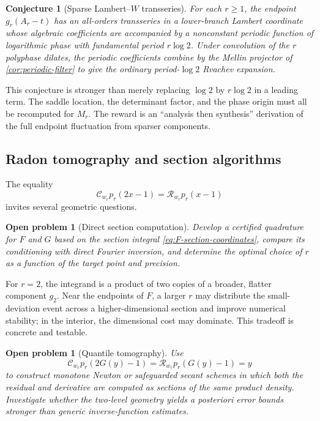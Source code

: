 \documentclass[11pt,oneside]{article}
\numberwithin{equation}{section}
\newtheorem{conjecture}[theorem]{Conjecture}
\newtheorem{problem}[theorem]{Open problem}
\theoremstyle{definition}
\theoremstyle{remark}
\newcommand{\cC}{\mathcal C}
\newcommand{\cR}{\mathcal R}
\begin{document}
\begin{conjecture}[Sparse Lambert--$W$ transseries]
\label{conj:sparse-Lambert}
For each $r\ge1$, the endpoint $g_r(A_r-t)$ has an all-orders transseries in a
lower-branch Lambert coordinate whose algebraic coefficients are accompanied
by a nonconstant periodic function of logarithmic phase with fundamental
period $r\log2$.  Under convolution of the $r$ polyphase dilates, the periodic
coefficients combine by the Mellin projector of
\cref{cor:periodic-filter} to give the ordinary period-$\log2$ Rvachev
expansion.
\end{conjecture}

This conjecture is stronger than merely replacing $\log2$ by $r\log2$ in a leading term.  The saddle location, the determinant
factor, and the phase origin must all be recomputed for $M_r$.  The reward is an
``analysis then synthesis'' derivation of the full endpoint fluctuation from
sparser components.

\subsection{Radon tomography and section algorithms}

The equality
\begin{equation}
 \cC_{w_r}p_r(2x-1)=\cR_{w_r}p_r(x-1)                      \label{eq:tomography-core}
\end{equation}
invites several geometric questions.

\begin{problem}[Direct section computation]
Develop a certified quadrature for $F$ and $G$ based on the section integral
\eqref{eq:F-section-coordinates}, compare its conditioning with direct Fourier
inversion, and determine the optimal choice of $r$ as a function of the target
point and precision.
\end{problem}

For $r=2$, the integrand is a product of two copies of a broader, flatter
component $g_2$.  Near the endpoints of $F$, a larger $r$ may distribute the
small-deviation event across a higher-dimensional section and improve numerical
stability; in the interior, the dimensional cost may dominate.  This tradeoff
is concrete and testable.

\begin{problem}[Quantile tomography]
Use
\begin{equation}
 \cC_{w_r}p_r(2G(y)-1)=\cR_{w_r}p_r(G(y)-1)=y              \label{eq:quantile-tomography-problem}
\end{equation}
to construct monotone Newton or safeguarded secant schemes in which both the
residual and derivative are computed as sections of the same product density.
Investigate whether the two-level geometry yields a posteriori error bounds
stronger than generic inverse-function estimates.
\end{problem}
\end{document}
